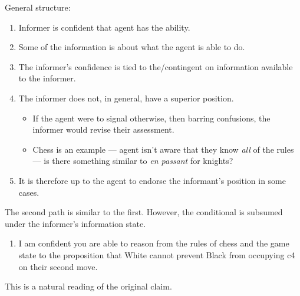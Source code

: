 \documentclass[10pt]{article}
\begin{document}
\begin{note}
  General structure:
  \begin{enumerate}
  \item Informer is confident that agent has the ability.
  \item Some of the information is about what the agent is able to do.
  \item The informer's confidence is tied to the/contingent on information available to the informer.
  \item The informer does not, in general, have a superior position.
    \begin{itemize}
    \item If the agent were to signal otherwise, then barring confusions, the informer would revise their assessment.
    \item Chess is an example --- agent isn't aware that they know \emph{all} of the rules --- is there something similar to \emph{en passant} for knights?
    \end{itemize}
  \item It is therefore up to the agent to endorse the informant's position in some cases.
  \end{enumerate}
\end{note}

The second path is similar to the first.
However, the conditional is subsumed under the informer's information state.

\begin{enumerate}
\item\label{chess:claim:1:confidence} I am confident you are able to reason from the rules of chess and the game state to the proposition that White cannot prevent Black from occupying c4 on their second move.
\end{enumerate}

This is a natural reading of the original claim.
\end{document}
